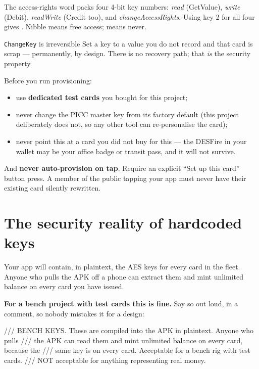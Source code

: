 The access-rights word packs four 4-bit key numbers: \emph{read} (GetValue),
\emph{write} (Debit), \emph{readWrite} (Credit too), and
\emph{changeAccessRights}. Using key 2 for all four gives . Nibble
 means free access;  means never.

\begin{trap}{\texttt{ChangeKey} is irreversible}
Set a key to a value you do not record and that card is scrap --- permanently, by
design. There is no recovery path; that \emph{is} the security property.

Before you run provisioning:
\begin{itemize}
  \item use \textbf{dedicated test cards} you bought for this project;
  \item never change the PICC master key from its factory default (this project
        deliberately does not, so any other tool can re-personalise the card);
  \item never point this at a card you did not buy for this --- the DESFire in
        your wallet may be your office badge or transit pass, and it will not
        survive.
\end{itemize}

And \textbf{never auto-provision on tap}. Require an explicit ``Set up this
card'' button press. A member of the public tapping your app must never have
their existing card silently rewritten.
\end{trap}

\section{The security reality of hardcoded keys}
\label{sec:realkeys}

Your app will contain, in plaintext, the AES keys for every card in the fleet.
Anyone who pulls the APK off a phone can extract them and mint unlimited balance
on every card you have issued.

\textbf{For a bench project with test cards this is fine.} Say so out loud, in a
comment, so nobody mistakes it for a design:

\begin{dcode}
/// BENCH KEYS. These are compiled into the APK in plaintext. Anyone who pulls
/// the APK can read them and mint unlimited balance on every card, because the
/// same key is on every card. Acceptable for a bench rig with test cards.
/// NOT acceptable for anything representing real money.
\end{dcode}

